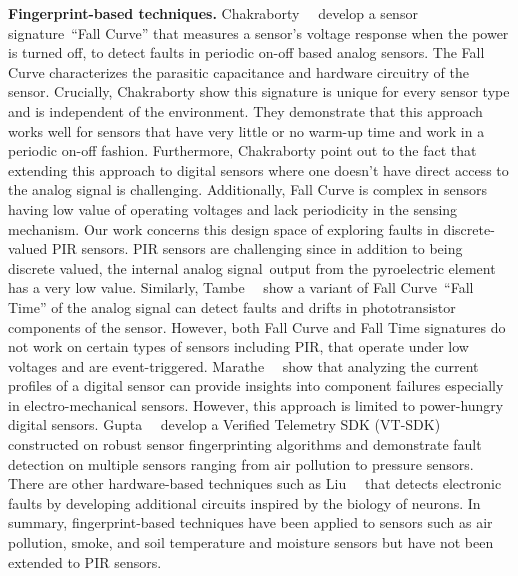 \textbf{Fingerprint-based techniques.} %
Chakraborty~\etal~\cite{chakraborty2018fall} develop a sensor signature~\viz ``Fall Curve'' that measures a sensor's voltage response when the power is turned off, to detect faults in periodic on-off based analog sensors. 
The Fall Curve characterizes the parasitic capacitance and hardware circuitry of the sensor. Crucially, Chakraborty \etal show this signature is unique for every sensor type and is independent of the environment. They demonstrate that this approach works well for sensors that have very little or no warm-up time and work in a periodic on-off fashion. 
Furthermore, Chakraborty \etal \cite{chakraborty2018fall} point out to the fact that extending this approach to digital sensors where one doesn't have direct access to the analog signal is challenging. Additionally, Fall Curve is complex in sensors having low value of operating voltages and lack periodicity in the sensing mechanism. Our work concerns this design space of exploring faults in discrete-valued PIR sensors. PIR sensors are challenging since in addition to being discrete valued, the internal analog signal~\viz output from the pyroelectric element has a very low value. 
Similarly, Tambe~\etal~\cite{10.1145/3458864.3466869} show a variant of Fall Curve~\ie ``Fall Time'' of the analog signal can detect faults and drifts in phototransistor components of the sensor.
However, both Fall Curve and Fall Time signatures do not work on certain types of sensors including PIR, that operate under low voltages and are event-triggered. Marathe~\etal~\cite{marathe2021currentsense} show that analyzing the current profiles of a digital sensor can provide insights into component failures especially in electro-mechanical sensors. However, this approach is limited to power-hungry digital sensors. %
Gupta~\etal~\cite{10.1145/3576842.3582386} develop a Verified Telemetry SDK (VT-SDK) constructed on robust sensor fingerprinting algorithms and demonstrate fault detection on multiple sensors ranging from air pollution to pressure sensors.
There are other hardware-based techniques such as Liu~\etal~\cite{Liu_Huang_Luo_Harkin_McDaid_2019} that detects electronic faults by developing additional circuits inspired by the biology of neurons.
In summary, fingerprint-based techniques have been applied to sensors such as air pollution, smoke, and soil temperature and moisture sensors but have not been extended to PIR sensors.

